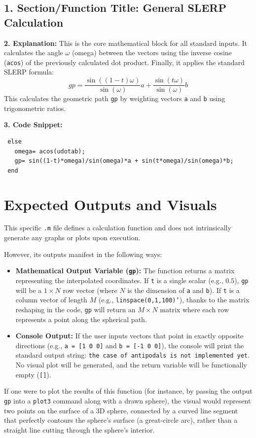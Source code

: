\subsection*{1. Section/Function Title: General SLERP Calculation}
\textbf{2. Explanation:} This is the core mathematical block for all standard inputs. It calculates the angle $\omega$ (omega) between the vectors using the inverse cosine (\texttt{acos}) of the previously calculated dot product. Finally, it applies the standard SLERP formula:
$$ gp = \frac{\sin((1-t)\omega)}{\sin(\omega)}a + \frac{\sin(t\omega)}{\sin(\omega)}b $$
This calculates the geometric path \texttt{gp} by weighting vectors \texttt{a} and \texttt{b} using trigonometric ratios.

\textbf{3. Code Snippet:}
\begin{lstlisting}
 else
   omega= acos(udotab);
   gp= sin((1-t)*omega)/sin(omega)*a + sin(t*omega)/sin(omega)*b;
 end
\end{lstlisting}

\section{Expected Outputs and Visuals}

This specific \texttt{.m} file defines a calculation function and does not intrinsically generate any graphs or plots upon execution. 

However, its outputs manifest in the following ways:
\begin{itemize}
    \item \textbf{Mathematical Output Variable (\texttt{gp}):} The function returns a matrix representing the interpolated coordinates. If \texttt{t} is a single scalar (e.g., $0.5$), \texttt{gp} will be a $1 \times N$ row vector (where $N$ is the dimension of \texttt{a} and \texttt{b}). If \texttt{t} is a column vector of length $M$ (e.g., \texttt{linspace(0,1,100)'}), thanks to the matrix reshaping in the code, \texttt{gp} will return an $M \times N$ matrix where each row represents a point along the spherical path.
    \item \textbf{Console Output:} If the user inputs vectors that point in exactly opposite directions (e.g., \texttt{a = [1 0 0]} and \texttt{b = [-1 0 0]}), the console will print the standard output string: \texttt{the case of antipodals is not implemented yet}. No visual plot will be generated, and the return variable will be functionally empty (\texttt{[]}).
\end{itemize}

If one were to plot the results of this function (for instance, by passing the output \texttt{gp} into a \texttt{plot3} command along with a drawn sphere), the visual would represent two points on the surface of a 3D sphere, connected by a curved line segment that perfectly contours the sphere's surface (a great-circle arc), rather than a straight line cutting through the sphere's interior.
